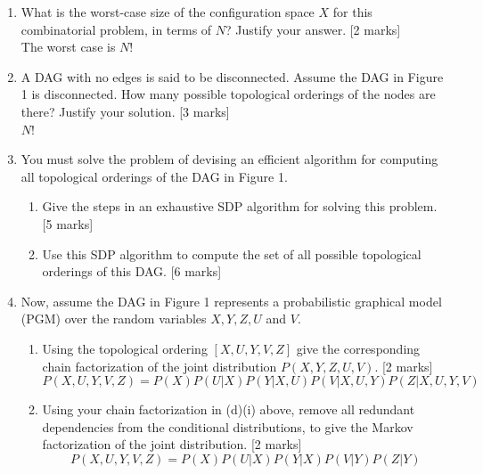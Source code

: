 \begin{enumerate}[label=(\alph*)]
    \item What is the worst-case size of the configuration space $X$ for this combinatorial problem, in terms of $N$? Justify your answer. \hfill [2 marks]\\
    {\color{red}
    The worst case is $N!$}

    \item A DAG with no edges is said to be disconnected. Assume the DAG in Figure 1 is disconnected. How many possible topological orderings of the nodes are there? Justify your solution. \hfill [3 marks]\\
    {\color{red} $N!$}
    \item You must solve the problem of devising an efficient algorithm for computing all topological orderings of the DAG in Figure 1.
    \begin{enumerate}[label=(\roman*)]
        \item Give the steps in an exhaustive SDP algorithm for solving this problem. \hfill [5 marks]
        \item Use this SDP algorithm to compute the set of all possible topological orderings of this DAG. \hfill [6 marks]
    \end{enumerate}

    \item Now, assume the DAG in Figure 1 represents a probabilistic graphical model (PGM) over the random variables $X, Y, Z, U$ and $V$.
    \begin{enumerate}[label=(\roman*)]
        \item Using the topological ordering $[X, U, Y, V, Z]$ give the corresponding chain factorization of the joint distribution $P(X, Y, Z, U, V)$. \hfill [2 marks]\\
        \[
        P(X,U,Y,V,Z) = P(X)P(U|X)P(Y|X,U)P(V|X,U,Y)P(Z|X,U,Y,V)
        \]
        \item Using your chain factorization in (d)(i) above, remove all redundant dependencies from the conditional distributions, to give the Markov factorization of the joint distribution. \hfill [2 marks]
        \[
        P(X,U,Y,V,Z) = P(X)P(U|X)P(Y|X)P(V|Y)P(Z|Y)
        \]
    \end{enumerate}
\end{enumerate}

